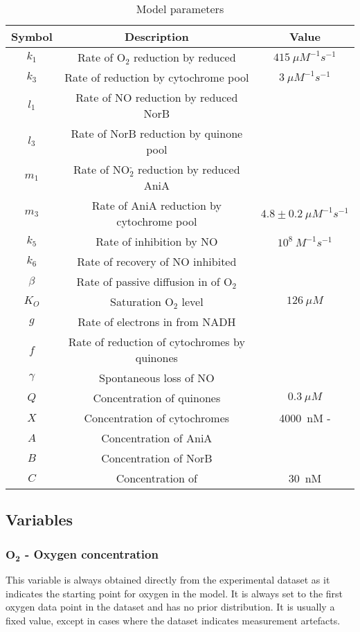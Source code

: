 \begin{table}[tbp]
\begin{center}
\begin{tabular}{ccc}
\toprule
\textbf{Symbol} & \textbf{Description} & \textbf{Value}\\
\midrule
$k_1$ & Rate of O$_{\textrm{2}}$ reduction by reduced \cbbthree{} & $415~\mu M^{-1} s^{-1}$ \\
$k_3$ & Rate of \cbbthree{} reduction by cytochrome pool & $3~\mu M^{-1} s^{-1}$\\ 
$l_1$ & Rate of NO reduction by reduced NorB\\
$l_3$ & Rate of NorB reduction by quinone pool\\
$m_1$ & Rate of NO$_{\textrm{2}}^{\textrm{-}}$ reduction by reduced AniA\\
$m_3$ & Rate of AniA reduction by cytochrome pool & $4.8\pm0.2~\mu M^{-1}s^{-1}$\\
$k_5$ & Rate of \cbbthree{} inhibition by NO & $10^8~M ^{-1} s ^{-1}$\\
$k_6$ & Rate of recovery of NO inhibited \cbbthree{}\\
$\beta$ & Rate of passive diffusion in of O$_{\textrm{2}}$\\
$K_O$ & Saturation O$_{\textrm{2}}$ level & $126~\mu M$\\
$g$ & Rate of electrons in from NADH\\
$f$ & Rate of reduction of cytochromes by quinones\\
$\gamma$ & Spontaneous loss of NO\\
$Q$ & Concentration of quinones & $0.3~\mu M$\\
$X$ & Concentration of cytochromes & 4000~nM - \cbbthree{}\\   
$A$ & Concentration of AniA\\
$B$ & Concentration of NorB\\
$C$ & Concentration of \cbbthree{} & 30~nM \\
\bottomrule
\end{tabular}
\caption{Model parameters
\label{tab:ps}}
\end{center}
\end{table}

\subsection*{Variables}
\subsubsection*{$\mathbf{O_2}$ {\bf- Oxygen concentration}}
This variable is always obtained directly from the experimental dataset as it indicates the starting point for oxygen in the model. It is always set to the first oxygen data point in the dataset and has no prior distribution. It is usually a fixed value, except in cases where the dataset indicates measurement artefacts.

